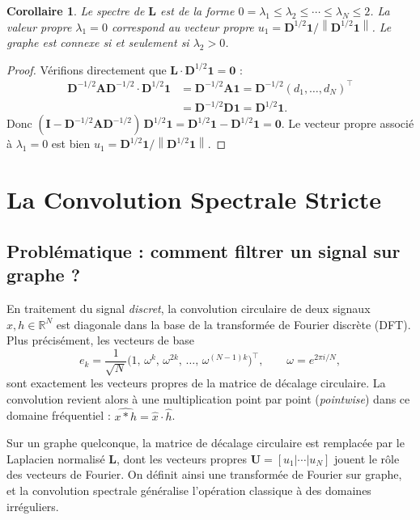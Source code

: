 \documentclass[12pt, a4paper]{article}
\newtheorem{corollary}[theorem]{Corollaire}
\theoremstyle{definition}
\newcommand{\R}{\mathbb{R}}
\newcommand{\mat}[1]{\mathbf{#1}}
\newcommand{\A}{\mat{A}}
\newcommand{\D}{\mat{D}}
\newcommand{\I}{\mat{I}}
\newcommand{\L}{\mat{L}}
\newcommand{\U}{\mat{U}}
\newcommand{\norm}[1]{\left\lVert #1 \right\rVert}
\begin{document}
\begin{corollary}
\label{cor:eigenvector_zero}
Le spectre de $\L$ est de la forme $0 = \lambda_1 \leq \lambda_2 \leq \cdots \leq \lambda_N \leq 2$.
La valeur propre $\lambda_1 = 0$ correspond au vecteur propre
$u_1 = \D^{1/2} \mathbf{1} / \norm{\D^{1/2} \mathbf{1}}$.
Le graphe est connexe si et seulement si $\lambda_2 > 0$.
\end{corollary}

\begin{proof}
Vérifions directement que $\L \cdot \D^{1/2}\mathbf{1} = \mathbf{0}$ :
\begin{align*}
  \D^{-1/2} \A \D^{-1/2} \cdot \D^{1/2}\mathbf{1}
  &= \D^{-1/2} \A \mathbf{1}
   = \D^{-1/2} (d_1, \ldots, d_N)^\top \\
  &= \D^{-1/2} \D \mathbf{1}
   = \D^{1/2} \mathbf{1}.
\end{align*}
Donc $(\I - \D^{-1/2} \A \D^{-1/2})\, \D^{1/2}\mathbf{1}
      = \D^{1/2}\mathbf{1} - \D^{1/2}\mathbf{1} = \mathbf{0}$.
Le vecteur propre associé à $\lambda_1 = 0$ est bien $u_1 = \D^{1/2}\mathbf{1}/\norm{\D^{1/2}\mathbf{1}}$.
\end{proof}

\section{La Convolution Spectrale Stricte}
\label{sec:spectral}

\subsection{Problématique : comment filtrer un signal sur graphe ?}

En traitement du signal \emph{discret}, la convolution circulaire de deux signaux
$x, h \in \R^N$ est diagonale dans la base de la transformée de Fourier discrète (DFT).
Plus précisément, les vecteurs de base
\[
  e_k = \frac{1}{\sqrt{N}}\bigl(1,\, \omega^k,\, \omega^{2k},\, \ldots,\, \omega^{(N-1)k}\bigr)^\top,
  \qquad \omega = e^{2\pi i / N},
\]
sont exactement les vecteurs propres de la matrice de décalage circulaire.
La convolution revient alors à une multiplication point par point ({\em pointwise})
dans ce domaine fréquentiel : $\widehat{x * h} = \hat{x} \cdot \hat{h}$.

Sur un graphe quelconque, la matrice de décalage circulaire est remplacée par le
Laplacien normalisé $\L$, dont les vecteurs propres $\U = [u_1 | \cdots | u_N]$
jouent le rôle des vecteurs de Fourier.
On définit ainsi une transformée de Fourier sur graphe, et la convolution spectrale
généralise l'opération classique à des domaines irréguliers.
\end{document}
